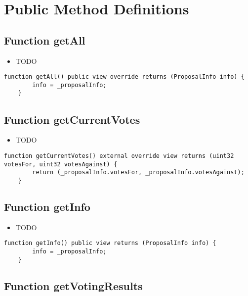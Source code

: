 \section{Public Method Definitions}


\subsection{Function getAll}

\begin{itemize}
\item TODO
\end{itemize}

\begin{lstlisting}[firstnumber=168]
    function getAll() public view override returns (ProposalInfo info) {
        info = _proposalInfo;
    }
\end{lstlisting}

\subsection{Function getCurrentVotes}

\begin{itemize}
\item TODO
\end{itemize}

\begin{lstlisting}[firstnumber=181]
    function getCurrentVotes() external override view returns (uint32 votesFor, uint32 votesAgainst) {
        return (_proposalInfo.votesFor, _proposalInfo.votesAgainst);
    }
\end{lstlisting}

\subsection{Function getInfo}

\begin{itemize}
\item TODO
\end{itemize}

\begin{lstlisting}[firstnumber=177]
    function getInfo() public view returns (ProposalInfo info) {
        info = _proposalInfo;
    }
\end{lstlisting}

\subsection{Function getVotingResults}

